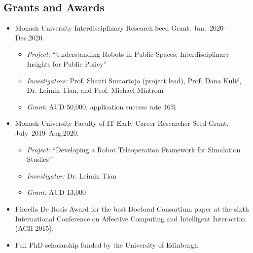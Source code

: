 \documentclass[11pt,letterpaper]{article}
\begin{document}
\subsection*{Grants and Awards}
\begin{itemize}
  \item Monash University Interdisciplinary Research Seed Grant. Jan.~2020--Dec.2020. 
  \begin{itemize}
    \item \emph{Project:} ``Understanding Robots in Public Spaces: Interdisciplinary Insights for Public Policy''
    \item \emph{Investigators:} Prof. Shanti Sumartojo (project lead), Prof. Dana Kuli{\'c}, Dr. Leimin Tian, and Prof. Michael Mintrom
    \item \emph{Grant:} AUD 50,000, application success rate 16\%
  \end{itemize}
  \item Monash University Faculty of IT Early Career Researcher Seed Grant. July~2019--Aug.2020.
  \begin{itemize}
    \item \emph{Project:} ``Developing a Robot Teleoperation Framework for Simulation Studies''
    \item \emph{Investigator:} Dr. Leimin Tian
    \item \emph{Grant:} AUD 13,000
  \end{itemize}
  \item Fiorella De Rosis Award for the best Doctoral Consortium paper at the sixth International Conference on Affective Computing and Intelligent Interaction (ACII 2015).
  \item Full PhD scholarship funded by the University of Edinburgh.
\end{itemize}
\end{document}
